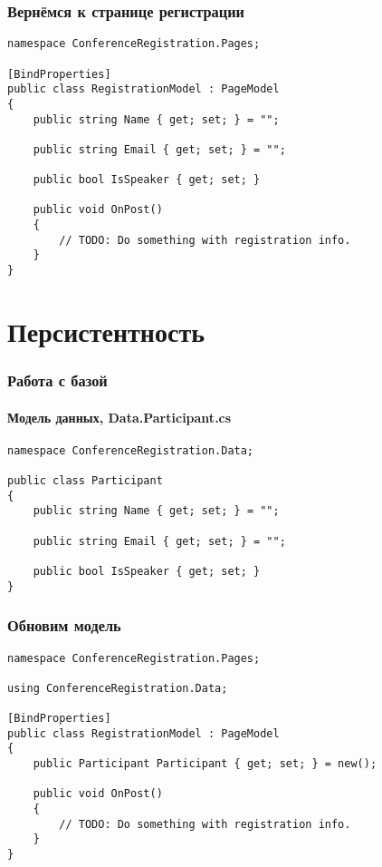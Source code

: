 \documentclass{../../slides-style}
\begin{document}
    \begin{frame}[fragile]
        \frametitle{Вернёмся к странице регистрации}
        \begin{footnotesize}
            \begin{verbatim}
namespace ConferenceRegistration.Pages;

[BindProperties]
public class RegistrationModel : PageModel
{
    public string Name { get; set; } = "";

    public string Email { get; set; } = "";

    public bool IsSpeaker { get; set; }

    public void OnPost()
    {
        // TODO: Do something with registration info.
    }
}
            \end{verbatim}
        \end{footnotesize}
    \end{frame}

    \section{Персистентность}

    \begin{frame}[fragile]
        \frametitle{Работа с базой}
        \framesubtitle{Модель данных, Data.Participant.cs}
        \begin{footnotesize}
            \begin{verbatim}
namespace ConferenceRegistration.Data;

public class Participant
{
    public string Name { get; set; } = "";

    public string Email { get; set; } = "";

    public bool IsSpeaker { get; set; }
}
            \end{verbatim}
        \end{footnotesize}
    \end{frame}

    \begin{frame}[fragile]
        \frametitle{Обновим модель}
        \begin{footnotesize}
            \begin{verbatim}
namespace ConferenceRegistration.Pages;

using ConferenceRegistration.Data;

[BindProperties]
public class RegistrationModel : PageModel
{
    public Participant Participant { get; set; } = new();

    public void OnPost()
    {
        // TODO: Do something with registration info.
    }
}
            \end{verbatim}
        \end{footnotesize}
    \end{frame}
\end{document}
